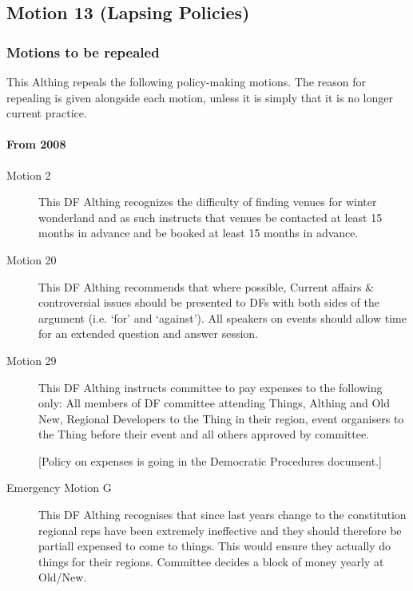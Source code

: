 \documentclass[a4paper, 11pt]{article} %
\begin{document}
\subsection{Motion 13 (Lapsing Policies)}

\subsubsection{Motions to be repealed}

This Althing repeals the following policy-making motions.  The reason for repealing is given alongside each motion, unless it is simply that it is no longer current practice.

\paragraph{From 2008}

\begin{description}
\item[Motion 2]  This DF Althing recognizes the difficulty of finding venues for winter wonderland and as such instructs that venues be contacted at least 15 months in advance and be booked at least 15 months in advance.

\item[Motion 20]  This DF Althing recommends that where possible, Current affairs \& controversial issues should be presented to DFs with both sides of the argument (i.e. ‘for’ and ‘against’). All speakers on events should allow time for an extended question and answer session.

\item[Motion 29]  This DF Althing instructs committee to pay expenses to the following only: All members of DF committee attending Things, Althing and Old New, Regional Developers to the Thing in their region, event organisers to the Thing before their event and all others approved by committee.

[Policy on expenses is going in the Democratic Procedures document.]

\item[Emergency Motion G]  This DF Althing recognises that since last years change to the constitution regional reps have been extremely ineffective and they should therefore be partiall expensed to come to things. This would ensure they actually do things for their regions.  Committee decides a block of money yearly at Old/New.
\end{description}
\end{document}
